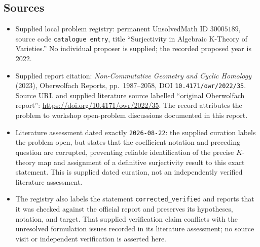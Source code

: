 \documentclass[11pt]{article}
\begin{document}
\subsection{Sources}
\begin{itemize}
\item Supplied local problem registry: permanent UnsolvedMath ID \(30005189\), source code \texttt{catalogue entry}, title ``Surjectivity in Algebraic K-Theory of Varieties.'' No individual proposer is supplied; the recorded proposed year is 2022.
\item Supplied report citation: \emph{Non-Commutative Geometry and Cyclic Homology} (2023), Oberwolfach Reports, pp.~1987--2058, DOI \texttt{10.4171/owr/2022/35}. Source URL and supplied literature source labelled ``original Oberwolfach report'': \url{https://doi.org/10.4171/owr/2022/35}. The record attributes the problem to workshop open-problem discussions documented in this report.
\item Literature assessment dated exactly \texttt{2026-08-22}: the supplied curation labels the problem open, but states that the coefficient notation and preceding question are corrupted, preventing reliable identification of the precise \(K\)-theory map and assignment of a definitive surjectivity result to this exact statement. This is supplied dated curation, not an independently verified literature assessment.
\item The registry also labels the statement \texttt{corrected\_verified} and reports that it was checked against the official report and preserves its hypotheses, notation, and target. That supplied verification claim conflicts with the unresolved formulation issues recorded in its literature assessment; no source visit or independent verification is asserted here.
\end{itemize}
\end{document}
